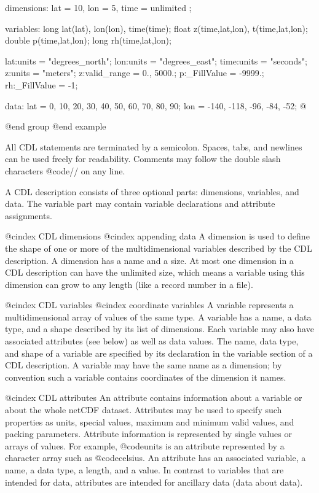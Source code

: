{{dimensions:
lat = 10, lon = 5, time = unlimited ;

variables:
  long    lat(lat), lon(lon), time(time);
  float   z(time,lat,lon), t(time,lat,lon);
  double  p(time,lat,lon);
  long    rh(time,lat,lon);

  lat:units = "degrees_north";
  lon:units = "degrees_east";
  time:units = "seconds";
  z:units = "meters";
  z:valid_range = 0., 5000.;
  p:_FillValue = -9999.;
  rh:_FillValue = -1;

data:
  lat   = 0, 10, 20, 30, 40, 50, 60, 70, 80, 90;
  lon   = -140, -118, -96, -84, -52;
@}
@end group
@end example

All CDL statements are terminated by a semicolon.  Spaces, tabs, and
newlines can be used freely for readability.  Comments may follow the
double slash characters @code{//} on any line.

A CDL description consists of three optional parts: dimensions,
variables, and data.  The variable part may contain variable
declarations and attribute assignments.

@cindex CDL dimensions
@cindex appending data
A dimension is used to define the shape of one or
more of the multidimensional variables described by the
CDL description.   A dimension has a name and a size.   At
most one dimension in a CDL description can have the unlimited size,
which means a variable using this dimension can grow to any
length (like a record number in a file).

@cindex CDL variables
@cindex coordinate variables
A variable represents a multidimensional array of values of the same
type.  A variable has a name, a data type, and a shape described by its
list of dimensions.  Each variable may also have associated attributes
(see below) as well as data values.  The name, data type, and shape of a
variable are specified by its declaration in the variable section of a
CDL description.  A variable may have the same name as a dimension; by
convention such a variable contains coordinates
of the dimension it names.

@cindex CDL attributes
An attribute contains information about a variable or about the whole
netCDF dataset.  Attributes may be used to specify such properties as
units, special values, maximum and minimum valid values, and packing
parameters.  Attribute information is represented
by single values or arrays of values.  For example, @code{units} is an
attribute represented by a character array such as @code{celsius}.  An
attribute has an associated variable, a name, a data type, a length, and
a value.  In contrast to variables that are intended for data,
attributes are intended for ancillary data (data about data).

}
